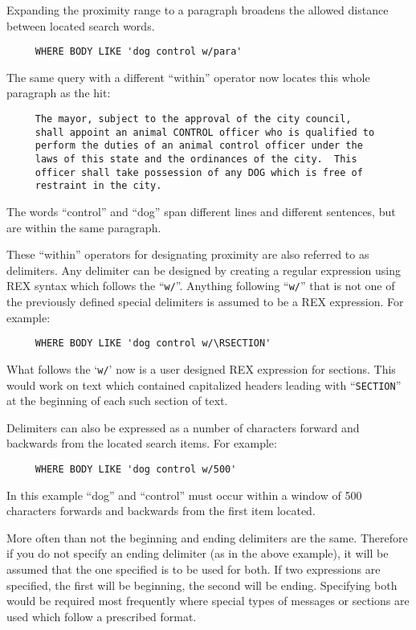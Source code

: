 Expanding the proximity range to a paragraph broadens the allowed
distance between located search words.

\begin{verbatim}
     WHERE BODY LIKE 'dog control w/para'
\end{verbatim}

The same query with a different ``within'' operator now locates this
whole paragraph as the hit:

\begin{verbatim}
     The mayor, subject to the approval of the city council,
     shall appoint an animal CONTROL officer who is qualified to
     perform the duties of an animal control officer under the
     laws of this state and the ordinances of the city.  This
     officer shall take possession of any DOG which is free of
     restraint in the city.
\end{verbatim}

The words ``control'' and ``dog'' span different lines and different
sentences, but are within the same paragraph.

These ``within'' operators for designating proximity are also referred
to as delimiters.  Any delimiter can be designed by creating a regular
expression using REX syntax which follows the ``\verb`w/`''.  Anything
following ``\verb`w/`'' that is not one of the previously defined
special delimiters is assumed to be a REX expression.  For example:

\begin{verbatim}
     WHERE BODY LIKE 'dog control w/\RSECTION'
\end{verbatim}

What follows the `\verb`w/`' now is a user designed REX expression for
sections. This would work on text which contained capitalized headers
leading with ``\verb`SECTION`'' at the beginning of each such section
of text.

Delimiters can also be expressed as a number of characters forward and
backwards from the located search items.  For example:

\begin{verbatim}
     WHERE BODY LIKE 'dog control w/500'
\end{verbatim}

In this example ``dog'' and ``control'' must occur within a window of
500 characters forwards and backwards from the first item located.

More often than not the beginning and ending delimiters are the same.
Therefore if you do not specify an ending delimiter (as in the above
example), it will be assumed that the one specified is to be used for
both.  If two expressions are specified, the first will be beginning,
the second will be ending.  Specifying both would be required most
frequently where special types of messages or sections are used which
follow a prescribed format.

